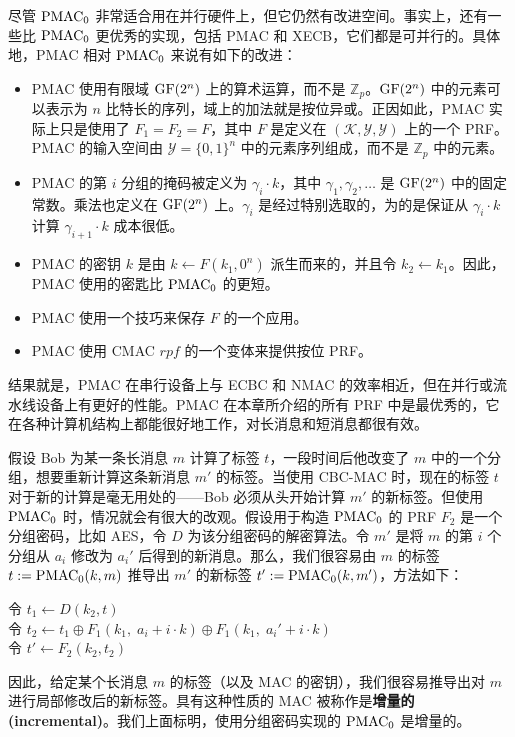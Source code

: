 \begin{snote}
尽管 $\rm PMAC_0$ 非常适合用在并行硬件上，但它仍然有改进空间。事实上，还有一些比 $\rm PMAC_0$  更优秀的实现，包括 PMAC 和 XECB，它们都是可并行的。具体地，PMAC 相对 $\rm PMAC_0$ 来说有如下的改进：
\begin{itemize}
	\item PMAC 使用有限域 ${\rm GF}(2^n)$ 上的算术运算，而不是 $\mathbb{Z}_p$。${\rm GF}(2^n)$ 中的元素可以表示为 $n$ 比特长的序列，域上的加法就是按位异或。正因如此，PMAC 实际上只是使用了 $F_1=F_2=F$，其中 $F$ 是定义在 $(\mathcal{K},\mathcal{Y},\mathcal{Y})$ 上的一个 PRF。PMAC 的输入空间由 $\mathcal{Y}=\{0,1\}^n$ 中的元素序列组成，而不是 $\mathbb{Z}_p$ 中的元素。
	\item PMAC 的第 $i$ 分组的掩码被定义为 $\gamma_i\cdot k$，其中 $\gamma_1,\gamma_2,\dots$ 是 ${\rm GF}(2^n)$ 中的固定常数。乘法也定义在 ${\rm GF}(2^n)$ 上。$\gamma_i$ 是经过特别选取的，为的是保证从 $\gamma_i\cdot k$ 计算 $\gamma_{i+1}\cdot k$ 成本很低。
	\item PMAC 的密钥 $k$ 是由 $k\leftarrow F(k_1,0^n)$ 派生而来的，并且令 $k_2\leftarrow k_1$。因此，PMAC 使用的密匙比 $\rm PMAC_0$ 的更短。
	\item PMAC 使用一个技巧来保存 $F$ 的一个应用。
	\item PMAC 使用 CMAC $rpf$ 的一个变体来提供按位 PRF。
\end{itemize}
结果就是，PMAC 在串行设备上与 ECBC 和 NMAC 的效率相近，但在并行或流水线设备上有更好的性能。PMAC 在本章所介绍的所有 PRF 中是最优秀的，它在各种计算机结构上都能很好地工作，对长消息和短消息都很有效。
\end{snote}

\begin{snote}
假设 Bob 为某一条长消息 $m$ 计算了标签 $t$，一段时间后他改变了 $m$ 中的一个分组，想要重新计算这条新消息 $m'$ 的标签。当使用 CBC-MAC 时，现在的标签 $t$ 对于新的计算是毫无用处的——Bob 必须从头开始计算 $m'$ 的新标签。但使用 $\rm PMAC_0$ 时，情况就会有很大的改观。假设用于构造 $\rm PMAC_0$ 的 PRF $F_2$ 是一个分组密码，比如 AES，令 $D$ 为该分组密码的解密算法。令 $m'$ 是将 $m$ 的第 $i$ 个分组从 $a_i$ 修改为 $a_i'$ 后得到的新消息。那么，我们很容易由 $m$ 的标签 $t:={\rm PMAC_0}(k,m)$ 推导出 $m'$ 的新标签 $t':={\rm PMAC_0}(k,m')$，方法如下：

\vspace{5pt}

\hspace*{5pt} 令 $t_1\leftarrow D(k_2,t)$\\
\hspace*{26pt} 令 $t_2\leftarrow t_1\oplus F_1(k_1,\;a_i+i\cdot k)\oplus F_1(k_1,\;a_i'+i\cdot k)$\\
\hspace*{26pt} 令 $t'\leftarrow F_2(k_2,t_2)$

\vspace{5pt}

\noindent
因此，给定某个长消息 $m$ 的标签（以及 MAC 的密钥），我们很容易推导出对 $m$ 进行局部修改后的新标签。具有这种性质的 MAC 被称作是\textbf{增量的(incremental)}。我们上面标明，使用分组密码实现的 $\rm PMAC_0$ 是增量的。
\end{snote}
